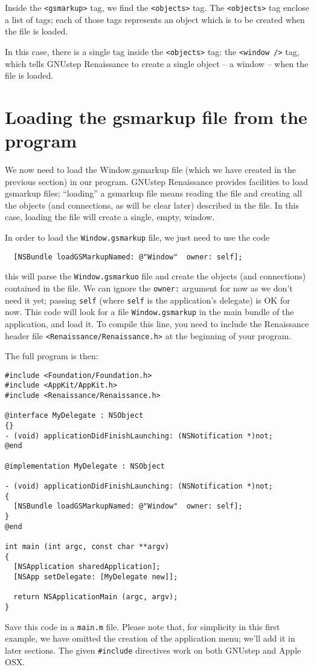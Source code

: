 \documentclass[a4paper]{article}
\begin{document}
Inside the \texttt{<gsmarkup>} tag, we find the \texttt{<objects>}
tag.  The \texttt{<objects>} tag enclose a list of tags; each of those
tags represents an object which is to be created when the file is
loaded.

In this case, there is a single tag inside the \texttt{<objects>} tag:
the \texttt{<window />} tag, which tells GNUstep Renaissance to create
a single object -- a window -- when the file is loaded.

\section{Loading the gsmarkup file from the program}
We now need to load the Window.gsmarkup file (which we have created in
the previous section) in our program.  GNUstep Renaissance provides
facilities to load gsmarkup files; ``loading'' a gsmarkup file means
reading the file and creating all the objects (and connections, as
will be clear later) described in the file.  In this case, loading the
file will create a single, empty, window.

In order to load the \texttt{Window.gsmarkup} file, we just need to
use the code
\begin{verbatim}
  [NSBundle loadGSMarkupNamed: @"Window"  owner: self];
\end{verbatim}
this will parse the \texttt{Window.gsmarkuo} file and create the
objects (and connections) contained in the file.  We can ignore the
\texttt{owner:} argument for now as we don't need it yet; passing
\texttt{self} (where \texttt{self} is the application's delegate) is
OK for now.  This code will look for a file \texttt{Window.gsmarkup}
in the main bundle of the application, and load it.  To compile this
line, you need to include the Renaissance header file
\texttt{<Renaissance/Renaissance.h>} at the beginning of your program.

The full program is then:
\begin{verbatim}
#include <Foundation/Foundation.h>
#include <AppKit/AppKit.h>
#include <Renaissance/Renaissance.h>

@interface MyDelegate : NSObject
{}
- (void) applicationDidFinishLaunching: (NSNotification *)not;
@end

@implementation MyDelegate : NSObject 

- (void) applicationDidFinishLaunching: (NSNotification *)not;
{
  [NSBundle loadGSMarkupNamed: @"Window"  owner: self];
}
@end

int main (int argc, const char **argv)
{ 
  [NSApplication sharedApplication];
  [NSApp setDelegate: [MyDelegate new]];

  return NSApplicationMain (argc, argv);
}
\end{verbatim}
Save this code in a \texttt{main.m} file.  Please note that, for
simplicity in this first example, we have omitted the creation of the
application menu; we'll add it in later sections.  The given
\texttt{\#include} directives work on both GNUstep and Apple OSX.
\end{document}
